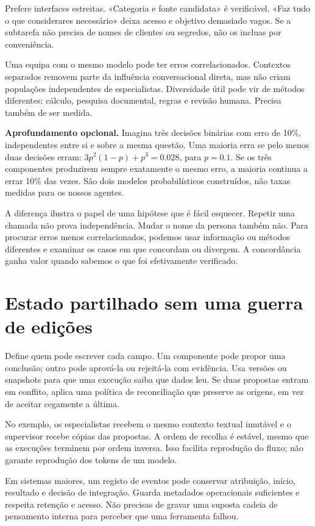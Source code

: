 Prefere interfaces estreitas. «Categoria e fonte candidata» é verificável. «Faz tudo o que considerares necessário» deixa acesso e objetivo demasiado vagos. Se a subtarefa não precisa de nomes de clientes ou segredos, não os incluas por conveniência.

Uma equipa com o mesmo modelo pode ter erros correlacionados. Contextos separados removem parte da influência conversacional direta, mas não criam populações independentes de especialistas. Diversidade útil pode vir de métodos diferentes: cálculo, pesquisa documental, regras e revisão humana. Precisa também de ser medida.

\textbf{Aprofundamento opcional.} Imagina três decisões binárias com erro de 10\%, independentes entre si e sobre a mesma questão. Uma maioria erra se pelo menos duas decisões erram: $3p^2(1-p)+p^3=0.028$, para $p=0.1$. Se os três componentes produzirem sempre exatamente o mesmo erro, a maioria continua a errar 10\% das vezes. São dois modelos probabilísticos construídos, não taxas medidas para os nossos agentes.

A diferença ilustra o papel de uma hipótese que é fácil esquecer. Repetir uma chamada não prova independência. Mudar o nome da persona também não. Para procurar erros menos correlacionados, podemos usar informação ou métodos diferentes e examinar os casos em que concordam ou divergem. A concordância ganha valor quando sabemos o que foi efetivamente verificado.

\section{Estado partilhado sem uma guerra de edições}
Define quem pode escrever cada campo. Um componente pode propor uma conclusão; outro pode aprová-la ou rejeitá-la com evidência. Usa versões ou snapshots para que uma execução saiba que dados leu. Se duas propostas entram em conflito, aplica uma política de reconciliação que preserve as origens, em vez de aceitar cegamente a última.

No exemplo, os especialistas recebem o mesmo contexto textual imutável e o supervisor recebe cópias das propostas. A ordem de recolha é estável, mesmo que as execuções terminem por ordem inversa. Isso facilita reprodução do fluxo; não garante reprodução dos tokens de um modelo.

Em sistemas maiores, um registo de eventos pode conservar atribuição, início, resultado e decisão de integração. Guarda metadados operacionais suficientes e respeita retenção e acesso. Não precisas de gravar uma suposta cadeia de pensamento interna para perceber que uma ferramenta falhou.

